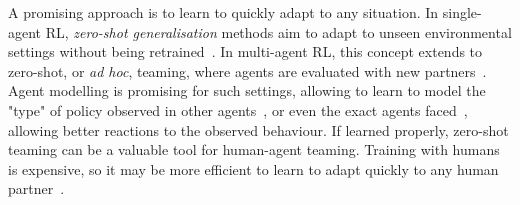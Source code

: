 A promising approach is to learn to quickly adapt to any situation. In single-agent RL, \textit{zero-shot generalisation} methods aim to adapt to unseen environmental settings without being retrained~\citep{Kirk2023_ZeroShotGene, Haarnoja2024_Soccer}. In multi-agent RL, this concept extends to zero-shot, or \textit{ad hoc}, teaming, where agents are evaluated with new partners~\citep{Stone2010_AdHocTeam}. Agent modelling is promising for such settings, allowing to learn to model the "type" of policy observed in other agents~\citep{Strouse2021_FCP, Xie2021_LILI, Rahman2023_GPL, Yan2023_E3T}, or even the exact agents faced~\citep{Barrett2017_MakingFriends, Lanctot2023_RockPaperScissors}, allowing better reactions to the observed behaviour. If learned properly, zero-shot teaming can be a valuable tool for human-agent teaming. Training with humans is expensive, so it may be more efficient to learn to adapt quickly to any human partner~\citep{Strouse2021_FCP, Shih2021_ConventionsHumanAI, Xie2021_LILI, Yu2023_HiddenUtilitySP, Yan2023_E3T}. 






